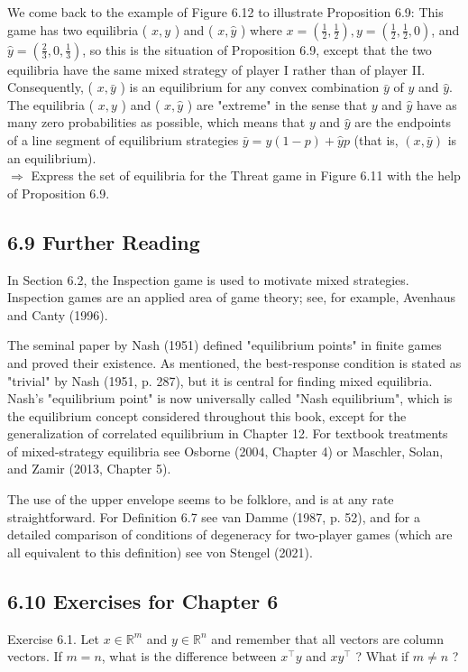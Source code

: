 \documentclass[12pt]{article}
\begin{document}
We come back to the example of Figure 6.12 to illustrate Proposition 6.9: This game has two equilibria ( $x, y$ ) and ( $x, \hat{y}$ ) where $x=\left(\frac{1}{2}, \frac{1}{2}\right), y=\left(\frac{1}{2}, \frac{1}{2}, 0\right)$, and $\hat{y}=\left(\frac{2}{3}, 0, \frac{1}{3}\right)$, so this is the situation of Proposition 6.9, except that the two equilibria have the same mixed strategy of player I rather than of player II. Consequently, ( $x, \bar{y}$ ) is an equilibrium for any convex combination $\bar{y}$ of $y$ and $\hat{y}$. The equilibria ( $x, y$ ) and ( $x, \hat{y}$ ) are "extreme" in the sense that $y$ and $\hat{y}$ have as many zero probabilities as possible, which means that $y$ and $\hat{y}$ are the endpoints of a line segment of equilibrium strategies $\bar{y}=y(1-p)+\hat{y} p$ (that is, $(x, \bar{y})$ is an equilibrium).\\
$\Rightarrow$ Express the set of equilibria for the Threat game in Figure 6.11 with the help of Proposition 6.9.

\subsection*{6.9 Further Reading}
In Section 6.2, the Inspection game is used to motivate mixed strategies. Inspection games are an applied area of game theory; see, for example, Avenhaus and Canty (1996).

The seminal paper by Nash (1951) defined "equilibrium points" in finite games and proved their existence. As mentioned, the best-response condition is stated as "trivial" by Nash (1951, p. 287), but it is central for finding mixed equilibria. Nash's "equilibrium point" is now universally called "Nash equilibrium", which is the equilibrium concept considered throughout this book, except for the generalization of correlated equilibrium in Chapter 12. For textbook treatments of mixed-strategy equilibria see Osborne (2004, Chapter 4) or Maschler, Solan, and Zamir (2013, Chapter 5).

The use of the upper envelope seems to be folklore, and is at any rate straightforward. For Definition 6.7 see van Damme (1987, p. 52), and for a detailed comparison of conditions of degeneracy for two-player games (which are all equivalent to this definition) see von Stengel (2021).

\subsection*{6.10 Exercises for Chapter 6}
Exercise 6.1. Let $x \in \mathbb{R}^{m}$ and $y \in \mathbb{R}^{n}$ and remember that all vectors are column vectors. If $m=n$, what is the difference between $x^{\top} y$ and $x y^{\top}$ ? What if $m \neq n$ ?
\end{document}
